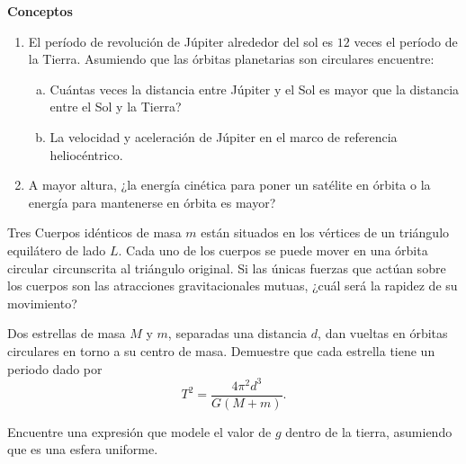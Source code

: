 \begin{mdframed}[style=warning]
	\textbf{Conceptos}
		\begin{enumerate}
			\item El período de revolución de Júpiter alrededor del sol es $12$ veces el período de la Tierra. Asumiendo que las órbitas planetarias son circulares encuentre:
			\begin{enumerate}[a)]
				\item Cuántas veces la distancia entre Júpiter y el Sol es mayor que la distancia entre el Sol y la Tierra?
				\item La velocidad y aceleración de Júpiter en el marco de referencia heliocéntrico.
			\end{enumerate}
			\item A mayor altura, ¿la energía cinética para poner un satélite en órbita o la energía para mantenerse en órbita es mayor?
		\end{enumerate}
\end{mdframed}






\begin{mdframed}[style=warning]
	\begin{ejercicio}
		Tres Cuerpos idénticos de masa $m$ están situados en los vértices de un triángulo equilátero de lado $L$. Cada uno de los cuerpos se puede mover en una órbita circular circunscrita al triángulo original. Si las únicas fuerzas que actúan sobre los cuerpos son las atracciones gravitacionales mutuas, ¿cuál será la rapidez de su movimiento?
	\end{ejercicio}
\end{mdframed}






\begin{mdframed}[style=warning]
	\begin{ejercicio}
		Dos estrellas de masa $M$ y $m$, separadas una distancia $d$, dan vueltas en órbitas circulares en torno a su centro de masa. Demuestre que cada estrella tiene un periodo dado por
			$$ T^2 = \frac{4\pi ^2 d^3}{G (M + m)}. $$
	\end{ejercicio}
\end{mdframed}









\begin{mdframed}[style=warning]
	\begin{ejercicio}
		Encuentre una expresión que modele el valor de $g$ dentro de la tierra, asumiendo que es una esfera uniforme.
	\end{ejercicio}
\end{mdframed}



















